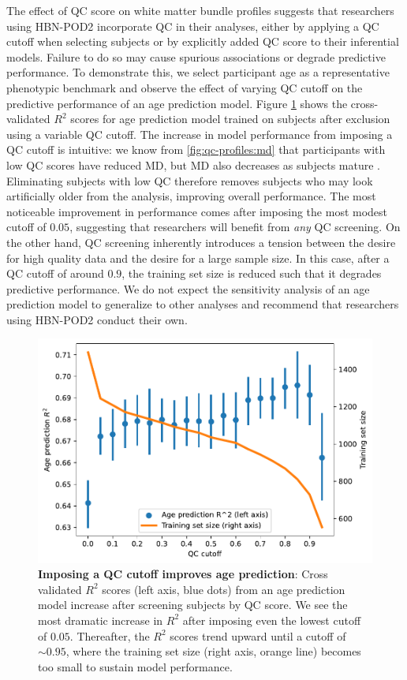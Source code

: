 \documentclass[fleqn,10pt]{wlscirep}
\begin{document}
The effect of QC score on white matter bundle profiles suggests that researchers
using HBN-POD2 incorporate QC in their analyses, either by applying a QC cutoff
when selecting subjects or by explicitly added QC score to their inferential
models. Failure to do so may cause spurious associations or degrade predictive
performance. To demonstrate this, we select participant age as a representative
phenotypic benchmark \cite{cole2019brain,richie-halford2021multidimensional} and
observe the effect of varying QC cutoff on the predictive performance of an age
prediction model. Figure \ref{fig:age-prediction} shows the cross-validated
$R^2$ scores for age prediction model trained on subjects after exclusion using a
variable QC cutoff. The increase in model performance from imposing a QC cutoff
is intuitive: we know from \ref{fig:qc-profiles:md} that participants with
low QC scores have reduced MD, but MD also decreases as subjects mature
\cite{yeatman2014lifespan,richie-halford2021multidimensional}.
Eliminating subjects with low QC therefore removes subjects who may look
artificially older from the analysis, improving overall performance. The most
noticeable improvement in performance comes after imposing the most modest
cutoff of $0.05$, suggesting that researchers will benefit from \emph{any} QC
screening. On the other hand, QC screening inherently introduces a tension
between the desire for high quality data and the desire for a large sample size.
In this case, after a QC cutoff of around $0.9$, the training set size is
reduced such that it degrades predictive performance. We do not expect the
sensitivity analysis of an age prediction model to generalize to other
analyses and recommend that researchers using HBN-POD2 conduct their own.

\begin{figure}[htbp]
    \centering
    \includegraphics[width=0.5\linewidth]{age-prediction/qc_sweep.pdf}
    \caption{%
        {\bf Imposing a QC cutoff improves age prediction}:
        Cross validated $R^2$ scores (left axis, blue dots) from an age
        prediction model increase after screening subjects by QC score. We see
        the most dramatic increase in $R^2$ after imposing even the lowest
        cutoff of $0.05$. Thereafter, the $R^2$ scores trend upward until a
        cutoff of $\sim 0.95$, where the training set size (right axis, orange
        line) becomes too small to sustain model performance.
    }
    \label{fig:age-prediction}
\end{figure}
\end{document}
